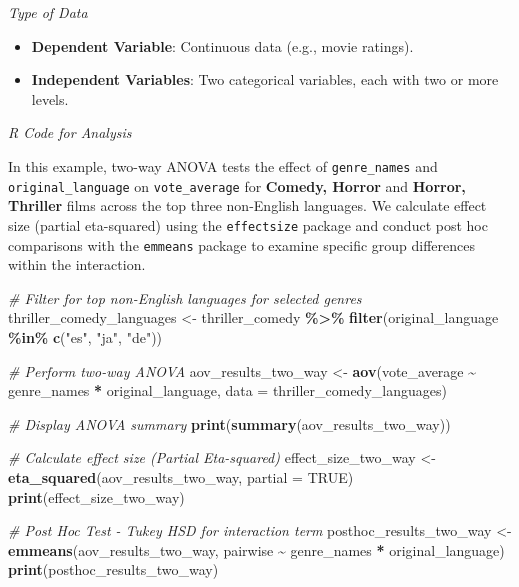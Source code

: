 \documentclass[
]{book}
\newenvironment{Shaded}{\begin{snugshade}}{\end{snugshade}}
\newcommand{\AttributeTok}[1]{\textcolor[rgb]{0.13,0.29,0.53}{#1}}
\newcommand{\CommentTok}[1]{\textcolor[rgb]{0.56,0.35,0.01}{\textit{#1}}}
\newcommand{\ConstantTok}[1]{\textcolor[rgb]{0.56,0.35,0.01}{#1}}
\newcommand{\FunctionTok}[1]{\textcolor[rgb]{0.13,0.29,0.53}{\textbf{#1}}}
\newcommand{\NormalTok}[1]{#1}
\newcommand{\OtherTok}[1]{\textcolor[rgb]{0.56,0.35,0.01}{#1}}
\newcommand{\SpecialCharTok}[1]{\textcolor[rgb]{0.81,0.36,0.00}{\textbf{#1}}}
\newcommand{\StringTok}[1]{\textcolor[rgb]{0.31,0.60,0.02}{#1}}
\providecommand{\tightlist}{%
  \setlength{\itemsep}{0pt}\setlength{\parskip}{0pt}}
\begin{document}
\emph{Type of Data}

\begin{itemize}
\tightlist
\item
  \textbf{Dependent Variable}: Continuous data (e.g., movie ratings).
\item
  \textbf{Independent Variables}: Two categorical variables, each with two or more levels.
\end{itemize}

\emph{R Code for Analysis}

In this example, two-way ANOVA tests the effect of \texttt{genre\_names} and \texttt{original\_language} on \texttt{vote\_average} for \textbf{Comedy, Horror} and \textbf{Horror, Thriller} films across the top three non-English languages. We calculate effect size (partial eta-squared) using the \texttt{effectsize} package and conduct post hoc comparisons with the \texttt{emmeans} package to examine specific group differences within the interaction.

\begin{Shaded}
\begin{Highlighting}[]
\CommentTok{\# Filter for top non{-}English languages for selected genres}
\NormalTok{thriller\_comedy\_languages }\OtherTok{\textless{}{-}}\NormalTok{ thriller\_comedy }\SpecialCharTok{\%\textgreater{}\%}
  \FunctionTok{filter}\NormalTok{(original\_language }\SpecialCharTok{\%in\%} \FunctionTok{c}\NormalTok{(}\StringTok{"es"}\NormalTok{, }\StringTok{"ja"}\NormalTok{, }\StringTok{"de"}\NormalTok{))}

\CommentTok{\# Perform two{-}way ANOVA}
\NormalTok{aov\_results\_two\_way }\OtherTok{\textless{}{-}} \FunctionTok{aov}\NormalTok{(vote\_average }\SpecialCharTok{\textasciitilde{}}\NormalTok{ genre\_names }\SpecialCharTok{*}\NormalTok{ original\_language, }\AttributeTok{data =}\NormalTok{ thriller\_comedy\_languages)}

\CommentTok{\# Display ANOVA summary}
\FunctionTok{print}\NormalTok{(}\FunctionTok{summary}\NormalTok{(aov\_results\_two\_way))}

\CommentTok{\# Calculate effect size (Partial Eta{-}squared)}
\NormalTok{effect\_size\_two\_way }\OtherTok{\textless{}{-}} \FunctionTok{eta\_squared}\NormalTok{(aov\_results\_two\_way, }\AttributeTok{partial =} \ConstantTok{TRUE}\NormalTok{)}
\FunctionTok{print}\NormalTok{(effect\_size\_two\_way)}

\CommentTok{\# Post Hoc Test {-} Tukey HSD for interaction term}
\NormalTok{posthoc\_results\_two\_way }\OtherTok{\textless{}{-}} \FunctionTok{emmeans}\NormalTok{(aov\_results\_two\_way, pairwise }\SpecialCharTok{\textasciitilde{}}\NormalTok{ genre\_names }\SpecialCharTok{*}\NormalTok{ original\_language)}
\FunctionTok{print}\NormalTok{(posthoc\_results\_two\_way)}
\end{Highlighting}
\end{Shaded}
\end{document}
